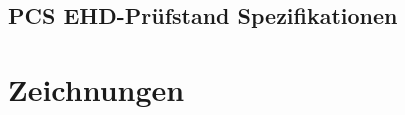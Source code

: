 \begin{appendices}
    \section{PCS EHD-Prüfstand Spezifikationen}
    

    \chapter{Zeichnungen}

\end{appendices}
